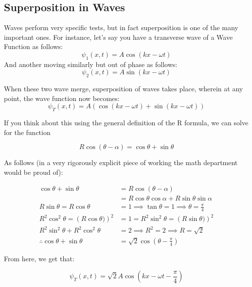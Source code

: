 \documentclass[a4paper,12pt,oneside]{book}
\begin{document}
\subsection{Superposition in Waves}

Waves perform very specific tests, but in fact superposition is one of the many important ones. For instance, let's say you have a transverse wave of a Wave Function as follows:
\[ \psi_1(x, t) = A \cos(kx - \omega t) \]
And another moving similarly but out of phase as follows:
\[ \psi_2(x, t) = A \sin(kx - \omega t) \]

When these two wave merge, superposition of waves takes place, wherein at any point, the wave function now becomes:
\[ \psi_T(x, t) = A \left(\cos(kx - \omega t) + \sin(kx - \omega t) \right) \]

If you think about this using the general definition of the R formula, we can solve for the function 

\[R \cos(\theta - \alpha) = \cos\theta + \sin\theta \]

As follows (in a very rigorously explicit piece of working the math department would be proud of):

\begin{align*}
    \cos\theta + \sin\theta &= R \cos(\theta - \alpha)  \\
    &= R \cos\theta\cos\alpha + R \sin\theta \sin\alpha \\
    R \sin\theta = R \cos\theta &= 1 \implies \tan\theta = 1 \implies \theta = \frac{\pi}{4} \\
    R^2\cos^2\theta = \left(R\cos\theta)\right)^2 &= 1 = R^2\sin^2\theta = \left(R\sin\theta)\right)^2 \\
    R^2\sin^2\theta + R^2\cos^2\theta  &= 2 \implies R^2 = 2 \implies R = \sqrt{2} \\
    \therefore \cos\theta + \sin\theta &= \sqrt{2} \cos \left(\theta - \frac{\pi}{4} \right) 
\end{align*}

From here, we get that:

\[ \psi_T(x, t) = \sqrt{2} A \cos \left(kx - \omega t - \frac{\pi}{4} \right) \]
\end{document}
